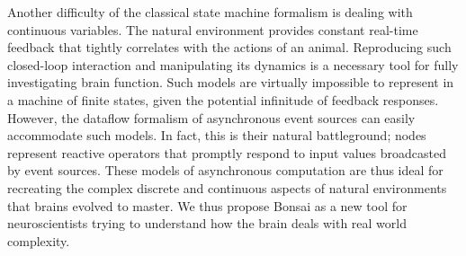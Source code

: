 Another difficulty of the classical state machine formalism is dealing with continuous variables. The natural environment provides constant real-time feedback that tightly correlates with the actions of an animal. Reproducing such closed-loop interaction and manipulating its dynamics is a necessary tool for fully investigating brain function. Such models are virtually impossible to represent in a machine of finite states, given the potential infinitude of feedback responses. However, the dataflow formalism of asynchronous event sources can easily accommodate such models. In fact, this is their natural battleground; nodes represent reactive operators that promptly respond to input values broadcasted by event sources. These models of asynchronous computation are thus ideal for recreating the complex discrete and continuous aspects of natural environments that brains evolved to master. We thus propose Bonsai as a new tool for neuroscientists trying to understand how the brain deals with real world complexity.
